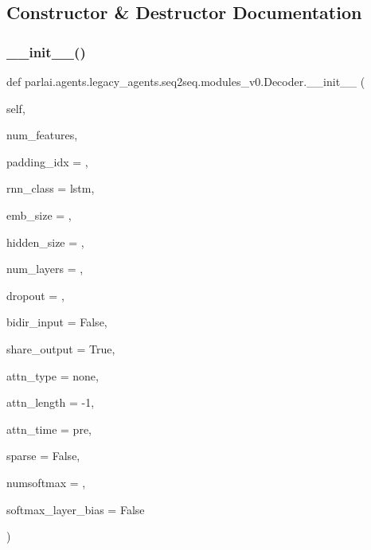 

\subsection{Constructor \& Destructor Documentation}
\mbox{\label{classparlai_1_1agents_1_1legacy__agents_1_1seq2seq_1_1modules__v0_1_1Decoder_a96b70aa2702cbca1322750098d236659}} 
\subsubsection{\texorpdfstring{\+\_\+\+\_\+init\+\_\+\+\_\+()}{\_\_init\_\_()}}
{\footnotesize\ttfamily def parlai.\+agents.\+legacy\+\_\+agents.\+seq2seq.\+modules\+\_\+v0.\+Decoder.\+\_\+\+\_\+init\+\_\+\+\_\+ (\begin{DoxyParamCaption}\item[{}]{self,  }\item[{}]{num\+\_\+features,  }\item[{}]{padding\+\_\+idx = {},  }\item[{}]{rnn\+\_\+class = {\ttfamily \textquotesingle{}lstm\textquotesingle{}},  }\item[{}]{emb\+\_\+size = {},  }\item[{}]{hidden\+\_\+size = {},  }\item[{}]{num\+\_\+layers = {},  }\item[{}]{dropout = {},  }\item[{}]{bidir\+\_\+input = {\ttfamily False},  }\item[{}]{share\+\_\+output = {\ttfamily True},  }\item[{}]{attn\+\_\+type = {\ttfamily \textquotesingle{}none\textquotesingle{}},  }\item[{}]{attn\+\_\+length = {\ttfamily -\/1},  }\item[{}]{attn\+\_\+time = {\ttfamily \textquotesingle{}pre\textquotesingle{}},  }\item[{}]{sparse = {\ttfamily False},  }\item[{}]{numsoftmax = {},  }\item[{}]{softmax\+\_\+layer\+\_\+bias = {\ttfamily False} }\end{DoxyParamCaption})}




